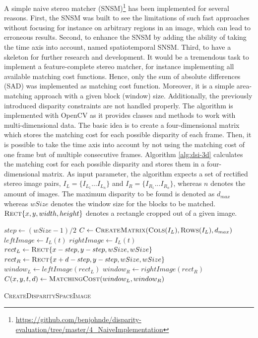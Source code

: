 A simple naive stereo matcher (SNSM)\footnote{\url{https://github.com/benjohnde/disparity-evaluation/tree/master/4_NaiveImplementation}} has been implemented for several reasons.
First, the SNSM was built to see the limitations of such fast approaches without focusing for instance on arbitrary regions in an image, which can lead to erroneous results.
Second, to enhance the SNSM by adding the ability of taking the time axis into account, named spatiotemporal SNSM.
Third, to have a skeleton for further research and development.
It would be a tremendous task to implement a feature-complete stereo matcher, for instance implementing all available matching cost functions.
Hence, only the sum of absolute differences (SAD) was implemented as matching cost function.
Moreover, it is a simple area-matching approach with a given block (window) size.
Additionally, the previously introduced disparity constraints are not handled properly.
The algorithm is implemented with OpenCV as it provides classes and methods to work with multi-dimensional data.
\newline\newline\noindent The basic idea is to create a four-dimensional matrix which stores the matching cost for each possible disparity of each frame.
Then, it is possible to take the time axis into account by not using the matching cost of one frame but of multiple consecutive frames.
Algorithm \ref{alg:dsi-3d} calculates the matching cost for each possible disparity and stores them in a four-dimensional matrix.
As input parameter, the algorithm expects a set of rectified stereo image pairs, $I_L=\{I_{L_{1}}...I_{L_{n}}\}$ and $I_R=\{I_{R_{1}}...I_{R_{n}}\}$, whereas $n$ denotes the amount of images.
The maximum disparity to be found is denoted as $d_{max}$ whereas $wSize$ denotes the window size for the blocks to be matched.
$\textsc{Rect}\{x,y,width,height\}$ denotes a rectangle cropped out of a given image.

\begin{algorithm}[h!]
\DontPrintSemicolon
{}
$step \gets (wSize - 1) / 2$\;
$C \gets \textsc{CreateMatrix}(\textsc{Cols}(I_L),\textsc{Rows}(I_L),d_{max})$\;
 {
  $leftImage \gets I_L(t)$\;
  $rightImage \gets I_L(t)$\;
   {
     {
       {
        $rect_{L} \gets \textsc{Rect}\{x - step, y - step, wSize, wSize\}$\;
        $rect_{R} \gets \textsc{Rect}\{x + d - step, y - step, wSize, wSize\}$\;
        $window_{L} \gets leftImage(rect_{L})$\;
        $window_{R} \gets rightImage(rect_{R})$\;
        $C(x,y,t,d) \gets \textsc{MatchingCost}(window_{L}, window_{R})$\;
      }
    }
  }
}
\;
\caption{\textsc{CreateDisparitySpaceImage}}
\label{alg:dsi-3d}
\end{algorithm}

